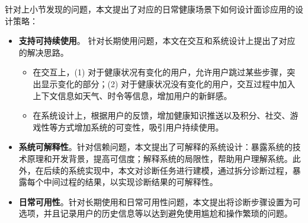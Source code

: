 针对上小节发现的问题，本文提出了对应的日常健康场景下如何设计面诊应用的设计策略：
\begin{itemize}
    \item \textbf{支持可持续使用}。
    针对长期使用问题，本文在交互和系统设计上提出了对应的解决思路。
        \begin{itemize}
            \item 在交互上，(1) 对于健康状况有变化的用户，允许用户跳过某些步骤，突出显示变化的部分；(2) 对于健康状况没有变化的用户，交互过程中加入上下文信息如天气、时令等信息，增加用户的新鲜感。
            \item 在系统设计上，根据用户的反馈，增加健康知识推送以及积分、社交、游戏性等方式增加系统的可变性，吸引用户持续使用。
        \end{itemize}
    \item \textbf{系统可解释性}。针对信赖问题，本文提出了可解释的系统设计：暴露系统的技术原理和开发背景，提高可信度；解释系统的局限性，帮助用户理解系统。此外，在后续的系统实现中，本文对诊断任务进行建模，通过拆分诊断过程，暴露每个中间过程的结果，以实现诊断结果的可解释性。
    \item \textbf{日常可用性}。针对长期使用和日常可用性问题，本文提出将诊断步骤设置为可选项，并且记录用户的历史信息等以达到避免使用尴尬和操作繁琐的问题。
\end{itemize}


